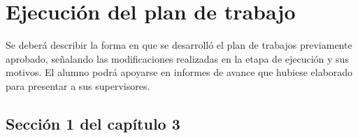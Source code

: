 
\chapter{Ejecución del plan de trabajo} %
\label{Chapter3} %

Se deberá describir la forma en que se desarrolló el plan de trabajos previamente aprobado, señalando las modificaciones realizadas en la etapa de ejecución y sus motivos. El alumno podrá apoyarse en informes de avance que hubiese elaborado para presentar a sus supervisores.

\section{Sección 1 del capítulo 3}


